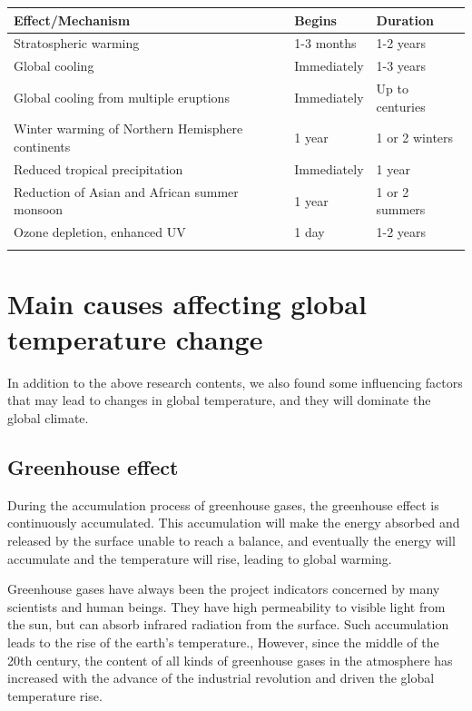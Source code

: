 \documentclass{apmcmthesis}
\begin{document}
\begin{table}
\centering
\begin{tabular}{lll} 
\toprule
Effect/Mechanism                                 & Begins      & Duration         \\ 
\midrule
Stratospheric warming                            & 1-3 months  & 1-2 years        \\
Global cooling                                   & Immediately & 1-3 years        \\
Global cooling from multiple eruptions           & Immediately & Up to centuries  \\
Winter warming of Northern Hemisphere continents & 1 year      & 1 or 2 winters   \\
Reduced tropical precipitation                   & Immediately & 1 year           \\
Reduction of Asian and African summer monsoon    & 1 year      & 1 or 2 summers   \\
Ozone depletion, enhanced UV                     & 1 day       & 1-2 years        \\
\bottomrule
\label{table_vol}
\end{tabular}
\end{table}






\section{Main causes affecting global temperature change}
In addition to the above research contents, we also found some influencing factors that may lead to changes in global temperature, and they will dominate the global climate.
\subsection{Greenhouse effect}
During the accumulation process of greenhouse gases, the greenhouse effect is continuously accumulated. This accumulation will make the energy absorbed and released by the surface unable to reach a balance, and eventually the energy will accumulate and the temperature will rise, leading to global warming.

Greenhouse gases have always been the project indicators concerned by many scientists and human beings. They have high permeability to visible light from the sun, but can absorb infrared radiation from the surface. Such accumulation leads to the rise of the earth's temperature., However, since the middle of the 20th century, the content of all kinds of greenhouse gases in the atmosphere has increased with the advance of the industrial revolution and driven the global temperature rise.
\end{document}
